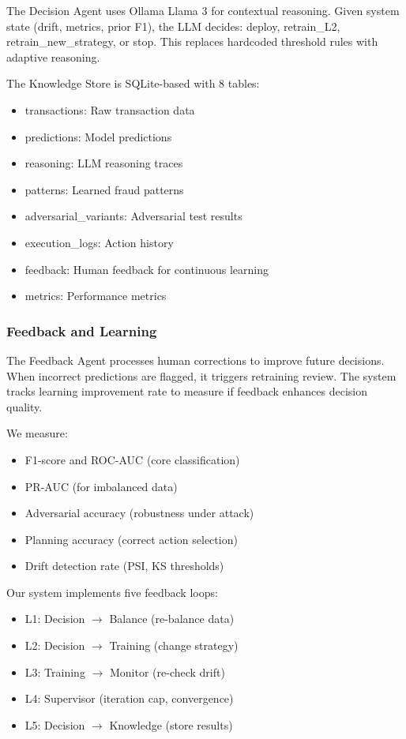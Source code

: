 
The Decision Agent uses Ollama Llama 3 for contextual reasoning. Given system state (drift, metrics, prior F1), the LLM decides: deploy, retrain\_L2, retrain\_new\_strategy, or stop. This replaces hardcoded threshold rules with adaptive reasoning.


The Knowledge Store is SQLite-based with 8 tables:
\begin{itemize}
  \item transactions: Raw transaction data
  \item predictions: Model predictions
  \item reasoning: LLM reasoning traces
  \item patterns: Learned fraud patterns
  \item adversarial\_variants: Adversarial test results
  \item execution\_logs: Action history
  \item feedback: Human feedback for continuous learning
  \item metrics: Performance metrics
\end{itemize}

\subsubsection{Feedback and Learning}

The Feedback Agent processes human corrections to improve future decisions. When incorrect predictions are flagged, it triggers retraining review. The system tracks learning improvement rate to measure if feedback enhances decision quality.


We measure:
\begin{itemize}
  \item F1-score and ROC-AUC (core classification)
  \item PR-AUC (for imbalanced data)
  \item Adversarial accuracy (robustness under attack)
  \item Planning accuracy (correct action selection)
  \item Drift detection rate (PSI, KS thresholds)
\end{itemize}


Our system implements five feedback loops:
\begin{itemize}
  \item L1: Decision $\rightarrow$ Balance (re-balance data)
  \item L2: Decision $\rightarrow$ Training (change strategy)
  \item L3: Training $\rightarrow$ Monitor (re-check drift)
  \item L4: Supervisor (iteration cap, convergence)
  \item L5: Decision $\rightarrow$ Knowledge (store results)
\end{itemize}

